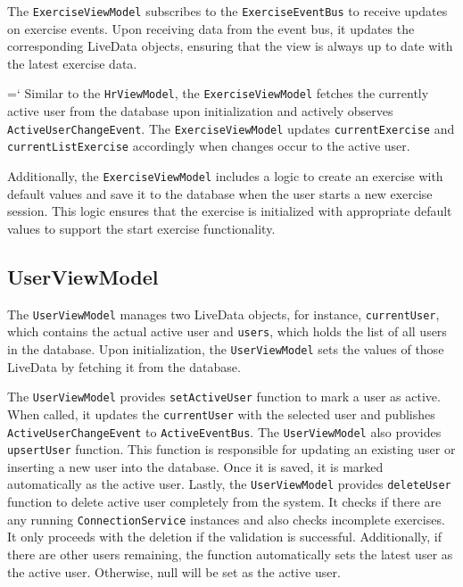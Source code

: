 The \verb;ExerciseViewModel; subscribes to the \verb;ExerciseEventBus; to receive updates on exercise events. Upon receiving data from the event bus, it updates the corresponding LiveData objects, ensuring that the view is always up to date with the latest exercise data.

{{\ttfamily \hyphenchar\the\font=`\-}
Similar to the \verb;HrViewModel;, the \verb;ExerciseViewModel; fetches the currently active user from the database upon initialization and actively observes \texttt{ActiveUserChangeEvent}.
The \verb;ExerciseViewModel; updates \verb;currentExercise; and \texttt{currentListExercise} accordingly when changes occur to the active user.
\par}

Additionally, the \verb;ExerciseViewModel; includes a logic to create an exercise with default values and save it to the database when the user starts a new exercise session. This logic ensures that the exercise is initialized with appropriate default values to support the start exercise functionality.

\subsection{UserViewModel}
\label{chap:userviewmodel_impl}
The \texttt{UserViewModel} manages two LiveData objects, for instance, \texttt{currentUser}, which contains the actual active user and \texttt{users}, which holds the list of all users in the database. 
Upon initialization, the \texttt{UserViewModel} sets the values of those LiveData by fetching it from the database.

The \texttt{UserViewModel} provides \texttt{setActiveUser} function to mark a user as active. When called, it updates the \texttt{currentUser} with the selected user and publishes \texttt{ActiveUserChangeEvent} to \texttt{ActiveEventBus}.
The \texttt{UserViewModel} also provides \texttt{upsertUser} function. This function is responsible for updating an existing user or inserting a new user into the database. Once it is saved, it is marked automatically as the active user.
Lastly, the \texttt{UserViewModel} provides \texttt{deleteUser} function to delete active user completely from the system.
It checks if there are any running \texttt{ConnectionService} instances and also checks incomplete exercises. 
It only proceeds with the deletion if the validation is successful. Additionally, if there are other users remaining, the function automatically sets the latest user as the active user. Otherwise, null will be set as the active user.

